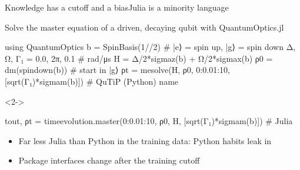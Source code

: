 \begin{frame}[fragile]{Knowledge has a cutoff and a bias}{Julia is a minority language}
\begin{prompt}
Solve the master equation of a driven, decaying qubit with QuantumOptics.jl
\end{prompt}
\begin{julia}
using QuantumOptics
b  = SpinBasis(1//2)                   # |e⟩ = spin up, |g⟩ = spin down
Δ, Ω, Γ₁ = 0.0, 2π, 0.1                # rad/μs
H  = Δ/2*sigmaz(b) + Ω/2*sigmax(b)
ρ0 = dm(spindown(b))                   # start in |g⟩
ρt = mesolve(H, ρ0, 0:0.01:10, [sqrt(Γ₁)*sigmam(b)])   # QuTiP (Python) name
\end{julia}
\begin{onlyenv}<2->
\begin{julia}
tout, ρt = timeevolution.master(0:0.01:10, ρ0, H, [sqrt(Γ₁)*sigmam(b)])   # Julia
\end{julia}
\end{onlyenv}
  \begin{itemize}
    \item<3-> Far less Julia than Python in the training data: Python habits leak in
    \item<4-> Package interfaces change after the training cutoff
  \end{itemize}
\end{frame}

